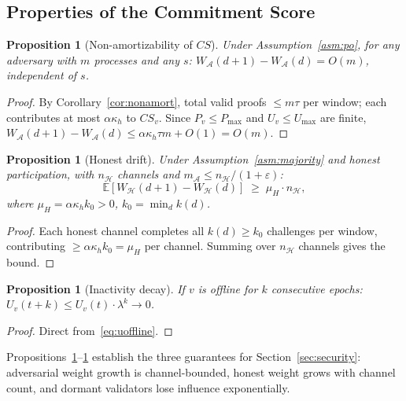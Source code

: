 \documentclass[10pt,journal,twoside]{IEEEtran}
\newtheorem{proposition}[theorem]{Proposition}
\theoremstyle{remark}
\newcommand{\CS}{\mathit{CS}}
\begin{document}
	\subsection{Properties of the Commitment Score}
	\label{ssec:csprops}
	
	\begin{proposition}[Non-amortizability of $\CS$]
		\label{prop:nonamort-cs}
		Under Assumption~\ref{asm:po}, for any adversary
		with $m$ processes and any $s$:
		$W_{\mathcal{A}}(d+1) - W_{\mathcal{A}}(d) = O(m)$,
		independent of $s$.
	\end{proposition}
	
	\begin{proof}
		By Corollary~\ref{cor:nonamort}, total valid proofs
		$\leq m\tau$ per window; each contributes at most
		$\alpha\kappa_h$ to $\CS_v$.
		Since $P_v \leq P_{\max}$ and $U_v \leq U_{\max}$
		are finite,
		$W_{\mathcal{A}}(d+1) - W_{\mathcal{A}}(d)
		\leq \alpha\kappa_h\tau m + O(1) = O(m)$.
	\end{proof}
	
	\begin{proposition}[Honest drift]
		\label{prop:honest-drift}
		Under Assumption~\ref{asm:majority} and honest
		participation, with $n_{\mathcal{H}}$ channels and
		$m_{\mathcal{A}} \leq n_{\mathcal{H}}/(1+\varepsilon)$:
		\[
		\mathbb{E}[W_{\mathcal{H}}(d+1) - W_{\mathcal{H}}(d)]
		\;\geq\;
		\mu_H \cdot n_{\mathcal{H}},
		\]
		where $\mu_H = \alpha\kappa_h k_0 > 0$,
		$k_0 = \min_d k(d)$.
	\end{proposition}
	
	\begin{proof}
		Each honest channel completes all $k(d) \geq k_0$
		challenges per window, contributing $\geq \alpha\kappa_h
		k_0 = \mu_H$ per channel.
		Summing over $n_{\mathcal{H}}$ channels gives the bound.
	\end{proof}
	
	\begin{proposition}[Inactivity decay]
		\label{prop:inactivity}
		If $v$ is offline for $k$ consecutive epochs:
		$U_v(t+k) \leq U_v(t) \cdot \lambda^k \to 0$.
	\end{proposition}
	
	\begin{proof}
		Direct from~\eqref{eq:uoffline}.
	\end{proof}
	
	Propositions~\ref{prop:nonamort-cs}--\ref{prop:inactivity}
	establish the three guarantees for Section~\ref{sec:security}:
	adversarial weight growth is channel-bounded, honest weight
	grows with channel count, and dormant validators lose
	influence exponentially.
	
\end{document}
